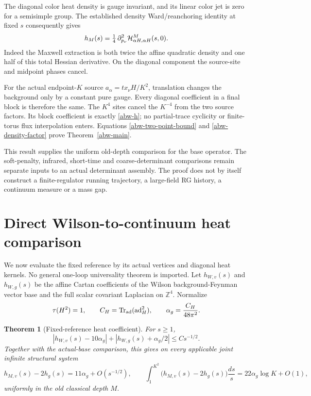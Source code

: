 \documentclass[11pt]{article}
\newtheorem{theorem}{Theorem}[section]
\theoremstyle{remark}
\begin{document}
The diagonal color heat density is gauge invariant, and its linear
color jet is zero for a semisimple group. The established density
Ward/reanchoring identity at fixed \(s\) consequently gives
\begin{equation}
 h_M(s)=\tfrac14\,
 \partial_{p_\nu}^2{\cal H}_{\alpha H,\alpha H}^M(s,0).
 \label{abw-density-factor}
\end{equation}
Indeed the Maxwell extraction is both twice the affine quadratic
density and one half of this total Hessian derivative. On the diagonal
component the source-site and midpoint phases cancel.

For the actual endpoint-\(K\) source \(a_\alpha=t x_\nu H/K^2\),
translation changes the background only by a constant pure gauge.
Every diagonal coefficient in a final block is therefore the same.
The \(K^4\) sites cancel the \(K^{-4}\) from the two source factors.
Its block coefficient is exactly \eqref{abw-h}; no partial-trace
cyclicity or finite-torus flux interpolation enters.
Equations \eqref{abw-two-point-bound} and \eqref{abw-density-factor}
prove Theorem~\ref{abw-main}.

This result supplies the uniform old-depth comparison for the base
operator. The soft-penalty, infrared, short-time and coarse-determinant
comparisons remain separate inputs to an actual determinant assembly.
The proof does not by itself construct a finite-regulator running
trajectory, a large-field RG history, a continuum measure or a mass gap.



\section{Direct Wilson-to-continuum heat comparison}
\label{wcr-section}

We now evaluate the fixed reference by its actual vertices and diagonal
heat kernels. No general one-loop universality theorem is imported.
Let \(h_{W,v}(s)\) and \(h_{W,g}(s)\) be the affine Cartan coefficients
of the Wilson background-Feynman vector base and the full scalar
covariant Laplacian on \(\mathbb Z^4\). Normalize
\[
 \tau(H^2)=1,\qquad C_H=\operatorname{Tr}_{\rm ad}
       (\operatorname{ad}_H^2),\qquad \alpha_g=\frac{C_H}{48\pi^2}.
\]

\begin{theorem}[Fixed-reference heat coefficient]
\label{wcr-main}
For \(s\ge1\),
\begin{equation}
 |h_{W,v}(s)-10\alpha_g|
 +|h_{W,g}(s)+\alpha_g/2|\le Cs^{-1/2}.
 \label{wcr-fixed-bound}
\end{equation}
Together with the actual-base comparison, this gives on every
applicable joint infinite structural system
\begin{equation}
 h_{M,v}(s)-2h_g(s)=11\alpha_g+O(s^{-1/2}),\qquad
 \int_1^{K^2}\bigl(h_{M,v}(s)-2h_g(s)\bigr)\frac{ds}{s}
       =22\alpha_g\log K+O(1),
 \label{wcr-middle}
\end{equation}
uniformly in the old classical depth \(M\).
\end{theorem}
\end{document}
